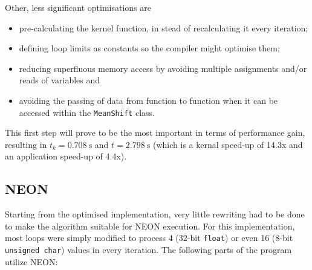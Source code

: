 \documentclass[final]{article}
\begin{document}
Other, less significant optimisations are
\begin{itemize}
     \item pre-calculating the kernel function, in stead of recalculating it every iteration;
     \item defining loop limits as constants so the compiler might optimise them;
     \item reducing superfluous memory access by avoiding multiple assignments and/or reads of variables and
     \item avoiding the passing of data from function to function when it can be accessed within the \texttt{MeanShift} class.
\end{itemize}

This first step will prove to be the most important in terms of performance gain, resulting in $t_k = \SI{0.708}{\second}$ and $t = \SI{2.798}{\second}$ (which is a kernal speed-up of 14.3x and an application speed-up of 4.4x).

\subsection{NEON}
Starting from the optimised implementation, very little rewriting had to be done to make the algorithm suitable for NEON execution. For this implementation, most loops were simply modified to process 4 (32-bit \texttt{float}) or even 16 (8-bit \texttt{unsigned char}) values in every iteration. The following parts of the program utilize NEON:
\end{document}
